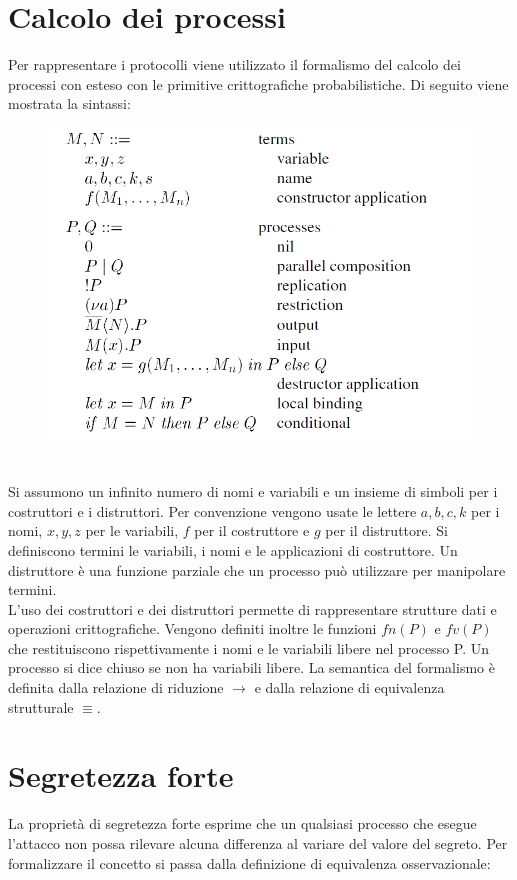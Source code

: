 \documentclass[12pt]{article}
\begin{document}
\section*{Calcolo dei processi}
Per rappresentare i protocolli viene utilizzato il formalismo del calcolo dei processi con esteso con le primitive crittografiche probabilistiche. Di seguito viene mostrata la sintassi:\\
\begin{figure}[h]
    \centering
    \includegraphics[scale=0.6]{Relazione/Immagini/calcolo.PNG}
\end{figure}\\
Si assumono un infinito numero di nomi e variabili e un insieme di simboli per i costruttori e i distruttori. Per convenzione vengono usate le lettere $a, b, c, k$ per i nomi, $x, y, z$ per le variabili, $f$ per il costruttore e $g$ per il distruttore. Si definiscono termini le variabili, i nomi e le applicazioni di costruttore. Un distruttore è una funzione parziale che un processo può utilizzare per manipolare termini.\\
L'uso dei costruttori e dei distruttori permette di rappresentare strutture dati e operazioni crittografiche. Vengono definiti inoltre le funzioni $fn(P)$ e $fv(P)$ che restituiscono rispettivamente i nomi e le variabili libere nel processo P. Un processo si dice chiuso se non ha variabili libere. La semantica del formalismo è definita dalla relazione di riduzione $ \xrightarrow{} $ e dalla relazione di equivalenza strutturale $ \equiv$.

\section*{Segretezza forte}
La proprietà di segretezza forte esprime che un qualsiasi processo che esegue l'attacco non possa rilevare alcuna differenza al variare del valore del segreto.
Per formalizzare il concetto si passa dalla definizione di equivalenza osservazionale:\\
\end{document}
